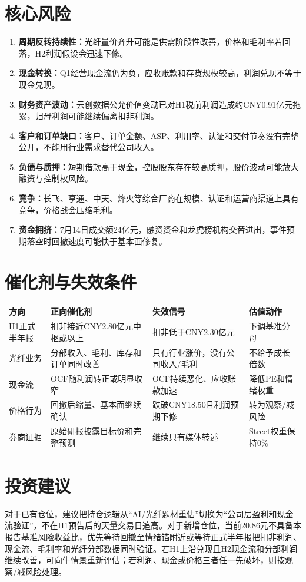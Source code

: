 \section{核心风险}
\begin{enumerate}
\item \textbf{周期反转持续性：}光纤量价齐升可能是供需阶段性改善，价格和毛利率若回落，H2利润假设会迅速下修。
\item \textbf{现金转换：}Q1经营现金流仍为负，应收账款和存货规模较高，利润兑现不等于现金兑现。
\item \textbf{财务资产波动：}云创数据公允价值变动已对H1税前利润造成约CNY0.91亿元拖累，归母利润可能继续偏离扣非利润。
\item \textbf{客户和订单缺口：}客户、订单金额、ASP、利用率、认证和交付节奏没有完整公开，不能用行业需求替代公司收入。
\item \textbf{负债与质押：}短期借款高于现金，控股股东存在较高质押，股价波动可能放大融资与控制权风险。
\item \textbf{竞争：}长飞、亨通、中天、烽火等综合厂商在规模、认证和运营商渠道上具有竞争，价格战会压缩毛利。
\item \textbf{资金拥挤：}7月14日成交额24亿元，融资资金和龙虎榜机构交替进出，事件预期落空时回撤速度可能快于基本面修复。
\end{enumerate}

\section{催化剂与失效条件}
\begin{exhibitbox}
\begin{tabularx}{\exhibitboxwidth}{L{2.8cm}X L{3.0cm}X}
\textbf{方向} & \textbf{正向催化剂} & \textbf{失效信号} & \textbf{估值动作} \\
H1正式半年报 & 扣非接近CNY2.80亿元中枢或以上 & 扣非低于CNY2.30亿元 & 下调基准分母 \\
光纤业务 & 分部收入、毛利、库存和订单同时改善 & 只有行业涨价，没有公司收入/毛利 & 不给予成长倍数 \\
现金流 & OCF随利润转正或明显收窄 & OCF持续恶化、应收账款加速 & 降低PE和情绪权重 \\
价格行为 & 回撤后缩量、基本面继续确认 & 跌破CNY18.50且利润预期下修 & 转为观察/减风险 \\
券商证据 & 原始研报披露目标价和完整预测 & 继续只有媒体转述 & Street权重保持0\% \\
\end{tabularx}
\end{exhibitbox}

\section{投资建议}
对于已有仓位，建议把持仓逻辑从“AI/光纤题材重估”切换为“公司层盈利和现金流验证”，不在H1预告后的天量交易日追高。对于新增仓位，当前20.86元不具备本报告基准风险收益比，优先等待回撤至情绪锚附近或等待正式半年报把扣非利润、现金流、毛利率和光纤分部数据同时验证。若H1上沿兑现且H2现金流和分部利润继续改善，可向牛情景重新评估；若利润、现金或价格三者任一先破坏，则按观察/减风险处理。
